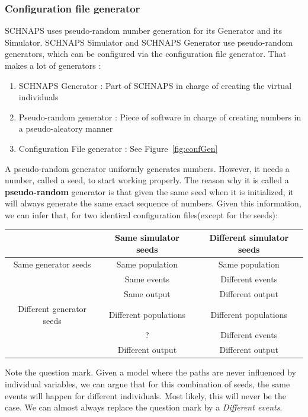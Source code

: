 \documentclass[a4paper,11pt]{report}
\begin{document}
\subsubsection{Configuration file generator}
SCHNAPS uses pseudo-random number generation for its Generator and its Simulator. SCHNAPS Simulator and SCHNAPS Generator use pseudo-random generators, which can be configured via the configuration file generator. That makes a lot of generators :
\begin{enumerate}
\item{SCHNAPS Generator : } Part of SCHNAPS in charge of creating the virtual individuals
\item{Pseudo-random generator : } Piece of software in charge of creating numbers in a pseudo-aleatory manner
\item{Configuration File generator : } See Figure~\ref{fig:confGen}
\end{enumerate}
A pseudo-random generator uniformly generates numbers. However, it needs a number, called a seed, to start working properly. The reason why it is called a \textbf{pseudo-random} generator is that given the same seed when it is initialized, it will always generate the same exact sequence of numbers. Given this information, we can infer that, for two identical configuration files(except for the seeds):

\begin{center}
  \begin{tabular}{ |c | c | c | }
    \cline{2-3}
    \multicolumn{1}{c|}{} & Same simulator seeds & Different simulator seeds \\ \hline
    Same generator seeds & Same population & Same population \\ & Same events & Different events  \\ & Same output & Different output \\ \hline
    Different generator seeds & Different populations & Different populations \\ & ? & Different events  \\ & Different output & Different output \\
    \hline
  \end{tabular}
\end{center}

Note the question mark. Given a model where the paths are never influenced by individual variables, we can argue that for this combination of seeds, the same events will happen for different individuals. Most likely, this will never be the case. We can almost always replace the question mark by a \emph{Different events}. 
\end{document}
